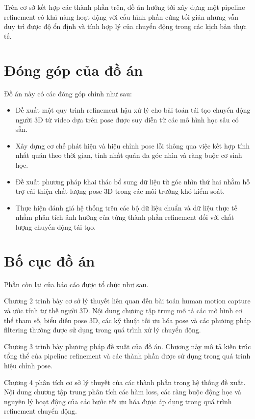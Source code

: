 \documentclass[../DoAn.tex]{subfiles}
\begin{document}
Trên cơ sở kết hợp các thành phần trên, đồ án hướng tới xây dựng một pipeline refinement có khả năng hoạt động với cấu hình phần cứng tối giản nhưng vẫn duy trì được độ ổn định và tính hợp lý của chuyển động trong các kịch bản thực tế.

\section{Đóng góp của đồ án}

Đồ án này có các đóng góp chính như sau:

\begin{itemize}
    \item Đề xuất một quy trình refinement hậu xử lý cho bài toán tái tạo chuyển động người 3D từ video dựa trên pose được suy diễn từ các mô hình học sâu có sẵn.

    \item Xây dựng cơ chế phát hiện và hiệu chỉnh pose lỗi thông qua việc kết hợp tính nhất quán theo thời gian, tính nhất quán đa góc nhìn và ràng buộc cơ sinh học.

    \item Đề xuất phương pháp khai thác bổ sung dữ liệu từ góc nhìn thứ hai nhằm hỗ trợ cải thiện chất lượng pose 3D trong các môi trường khó kiểm soát.

    \item Thực hiện đánh giá hệ thống trên các bộ dữ liệu chuẩn và dữ liệu thực tế nhằm phân tích ảnh hưởng của từng thành phần refinement đối với chất lượng chuyển động tái tạo.
\end{itemize}

\section{Bố cục đồ án}

Phần còn lại của báo cáo được tổ chức như sau.

Chương 2 trình bày cơ sở lý thuyết liên quan đến bài toán human motion capture và ước tính tư thế người 3D. Nội dung chương tập trung mô tả các mô hình cơ thể tham số, biểu diễn pose 3D, các kỹ thuật tối ưu hóa pose và các phương pháp filtering thường được sử dụng trong quá trình xử lý chuyển động.

Chương 3 trình bày phương pháp đề xuất của đồ án. Chương này mô tả kiến trúc tổng thể của pipeline refinement và các thành phần được sử dụng trong quá trình hiệu chỉnh pose.

Chương 4 phân tích cơ sở lý thuyết của các thành phần trong hệ thống đề xuất. Nội dung chương tập trung phân tích các hàm loss, các ràng buộc động học và nguyên lý hoạt động của các bước tối ưu hóa được áp dụng trong quá trình refinement chuyển động.
\end{document}
